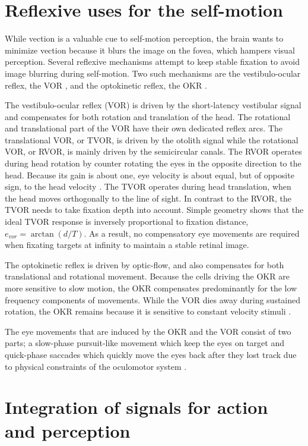 \section{Reflexive uses for the self-motion}
While vection is a valuable cue to self-motion perception, the brain wants to minimize vection because it blurs the image on the fovea, which hampers visual perception. Several reflexive mechanisms attempt to keep stable fixation to avoid image blurring during self-motion. Two such mechanisms are the vestibulo-ocular reflex, the VOR \cite{goldberg2012}, and the optokinetic reflex, the OKR \cite{purves2012}.

The vestibulo-ocular reflex (VOR) is driven by the short-latency vestibular signal and compensates for both rotation and translation of the head. The rotational and translational part of the VOR have their own dedicated reflex arcs. The translational VOR, or TVOR, is driven by the otolith signal while the rotational VOR, or RVOR, is mainly driven by the semicircular canals. The RVOR operates during head rotation by counter rotating the eyes in the opposite direction to the head. Because its gain is about one, eye velocity is about equal, but of opposite sign, to the head velocity \cite{goldberg2012}. The TVOR operates during head translation, when the head moves orthogonally to the line of sight. In contrast to the RVOR, the TVOR needs to take fixation depth into account. Simple geometry shows that the ideal TVOR response is inversely proportional to fixation distance, $e_{vor} = \arctan(d/T)$. As a result, no compensatory eye movements are required when fixating targets at infinity to maintain a stable retinal image. 

The optokinetic reflex is driven by optic-flow, and also compensates for both translational and rotational movement. Because the cells driving the OKR are more sensitive to slow motion, the OKR compensates predominantly for the low frequency components of movements. While the VOR dies away during sustained rotation, the OKR remains because it is sensitive to constant velocity stimuli \cite{soodak1988}.

The eye movements that are induced by the OKR and the VOR consist of two parts; a slow-phase pursuit-like movement which keep the eyes on target and quick-phase saccades which quickly move the eyes back after they lost track due to physical constraints of the oculomotor system \cite{goldberg2012}.

\section{Integration of signals for action and perception}

